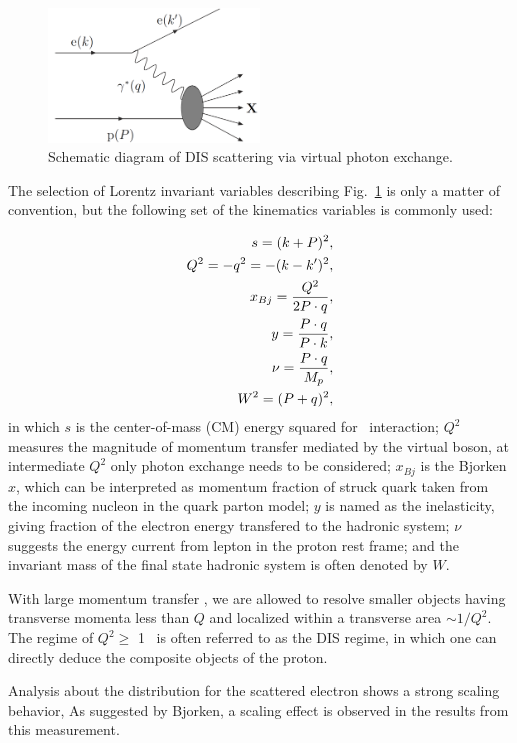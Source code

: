 \begin{figure}
\centering
\includegraphics[width=0.5\textwidth]{plots/chpt1/DIS_kinematics.png} 
\caption[DIS scattering diagram] {
Schematic diagram of DIS scattering via virtual photon exchange.
\label{fig:DIS_kinematics}
}
\end{figure}

The selection of Lorentz invariant variables describing Fig.~\ref{fig:DIS_kinematics} is only a matter of convention,
but the following set of the kinematics variables is commonly used:

\begin{align}
s = (k+P)^{2}, \\
Q^{2} = -q^{2} = -(k-k^{\prime})^{2}, \\
x_{Bj} = \frac{Q^{2}}{2P\cdot q}, \\
y = \frac{P\cdot q}{ P\cdot k}, \\
\nu = \frac{P\cdot q}{ M_{p} }, \\
W^{2} = (P+q)^{2},
\end{align}
in which $s$ is the center-of-mass (CM) energy squared for \ep\ interaction;
$Q^{2}$ measures the magnitude of momentum transfer mediated by the virtual
boson, at intermediate $Q^{2}$ only photon exchange needs to be considered;
$x_{Bj}$ is the Bjorken $x$, which can be interpreted as momentum fraction of
struck quark taken from the incoming nucleon in the quark parton model; $y$ is
named as the inelasticity, giving fraction of the electron energy transfered to
the hadronic system; $\nu$ suggests the energy current from lepton in the proton
rest frame; and the invariant mass of the final state hadronic system is often
denoted by $W$.


With large momentum transfer \qsq, we are allowed to resolve smaller objects
having transverse momenta less than $Q$ and localized within a transverse
area $\sim 1/Q^{2}$. The regime of $Q^{2}\geq$ 1 \gevsq\ is often referred
to as the DIS regime, in which one can directly deduce the composite objects
of the proton. 



Analysis about the distribution for the scattered electron shows a strong scaling
behavior, 
As suggested by Bjorken, a scaling effect is observed in the results from
this measurement. 

